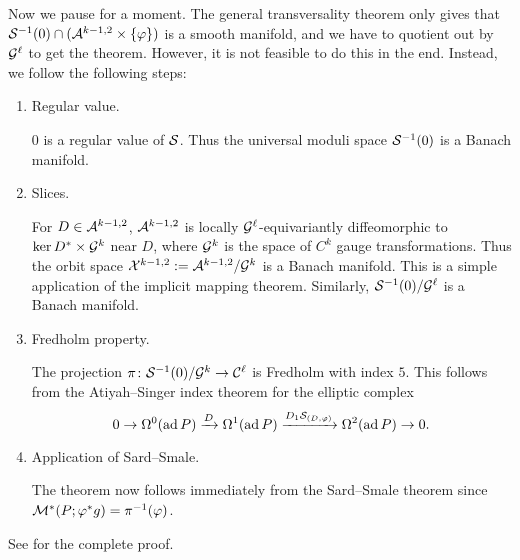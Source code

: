 \medskip

Now we pause for a moment. 
The general transversality theorem only gives that 
${\mathcal{S}}^{-1} (0) \cap ({\mathcal{A}}^{k - 1, 2} \times \{\varphi\})$ is a smooth 
manifold, and we have to quotient out by ${\mathcal{G}}^\ell$ to get the theorem. 
However, it is not feasible to do this in the end. 
Instead, we follow the following steps:
\begin{enumerate}
	\item Regular value.
		
		$0$ is a regular value of ${\mathcal{S}}$. 
		Thus the universal moduli space ${\mathcal{S}}^{-1} (0)$ is a Banach manifold.
		
	\item Slices.
		 
		For $D \in {\mathcal{A}}^{k - 1, 2}$, ${\mathcal{A}}^{k - 1, 2}$ is locally 
		${\mathcal{G}}^\ell$-equivariantly diffeomorphic to $\ker D^* \times {\mathcal{G}}^k$ 
		near $D$, where ${\mathcal{G}}^k$ is the space of $C^k$ gauge transformations. 
		Thus the orbit space ${\mathcal{X}}^{k - 1, 2} := {\mathcal{A}}^{k - 1, 2} / {\mathcal{G}}^k$ 
		is a Banach manifold. 
		This is a simple application of the implicit mapping theorem. 
		Similarly, ${\mathcal{S}}^{-1} (0) / {\mathcal{G}}^\ell$ is a Banach manifold.
		
	\item Fredholm property.
		
		The projection $\pi \colon {\mathcal{S}}^{-1} (0) / {\mathcal{G}}^k \to {\mathcal{C}}^\ell$ 
		is Fredholm with index $5$. 
		This follows from the Atiyah--Singer index theorem 
		for the elliptic complex 
		\[
			0 \to \Omega^0 (\operatorname{ad} P) \xrightarrow{D} \Omega^1 (\operatorname{ad} P) 
			\xrightarrow{D_1{\mathcal{S}}_{(D, \varphi)}} \Omega^2(\operatorname{ad} P) \to 0.
		\]
		
	\item Application of Sard--Smale.
		
		The theorem now follows immediately from the Sard--Smale theorem 
		since ${\mathcal{M}}^*(P; \varphi^*g) = \pi^{-1} (\varphi)$.
\end{enumerate}

See \cite{FU} for the complete proof.